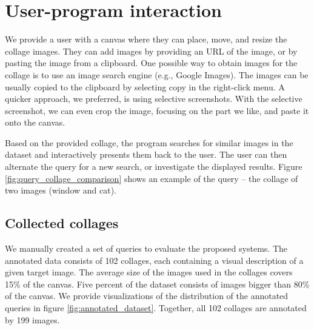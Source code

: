 \section{User-program interaction}

We provide a user with a canvas where they can place, move, and resize the collage images. They can add images by providing an URL of the image, or by pasting the image from a clipboard. One possible way to obtain images for the collage is to use an image search engine (e.g., Google Images). The images can be usually copied to the clipboard by selecting copy in the right-click menu. A quicker approach, we preferred, is using selective screenshots. With the selective screenshot, we can even crop the image, focusing on the part we like, and paste it onto the canvas.

Based on the provided collage, the program searches for similar images in the dataset and interactively presents them back to the user. The user can then alternate the query for a new search, or investigate the displayed results. Figure \ref{fig:query_collage_comparison} shows an example of the query -- the collage of two images (window and cat). 

\subsection{Collected collages}

We manually created a set of queries to evaluate the proposed systems. The annotated data consists of 102 collages, each containing a visual description of a given target image. The average size of the images used in the collages covers 15\% of the canvas. Five percent of the dataset consists of images bigger than 80\% of the canvas. We provide visualizations of the distribution of the annotated queries in figure \ref{fig:annotated_dataset}. Together, all 102 collages are annotated by 199 images.

